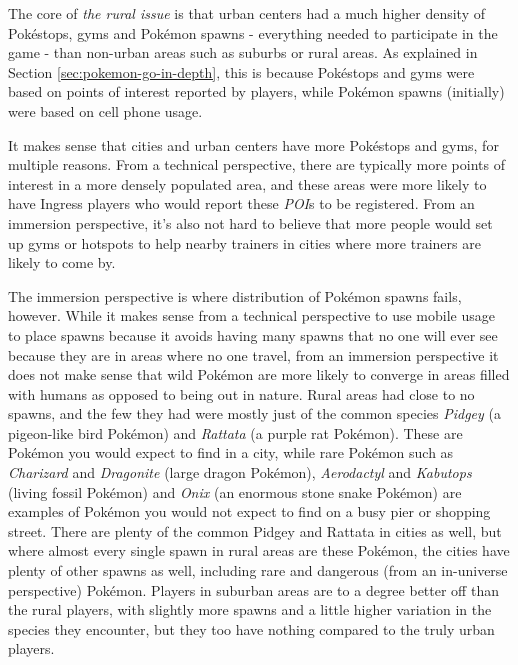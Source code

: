 The core of \emph{the rural issue} is that urban centers had a much higher density of Pokéstops, gyms and Pokémon spawns - everything needed to participate in the game - than non-urban areas such as suburbs or rural areas. As explained in Section \ref{sec:pokemon-go-in-depth}, this is because Pokéstops and gyms were based on points of interest reported by players, while Pokémon spawns (initially) were based on cell phone usage.

It makes sense that cities and urban centers have more Pokéstops and gyms, for multiple reasons. From a technical perspective, there are typically more points of interest in a more densely populated area, and these areas were more likely to have Ingress players who would report these \emph{POI}s to be registered. From an immersion perspective, it's also not hard to believe that more people would set up gyms or hotspots to help nearby trainers in cities where more trainers are likely to come by.

The immersion perspective is where distribution of Pokémon spawns fails, however. While it makes sense from a technical perspective to use mobile usage to place spawns because it avoids having many spawns that no one will ever see because they are in areas where no one travel, from an immersion perspective it does not make sense that wild Pokémon are more likely to converge in areas filled with humans as opposed to being out in nature. Rural areas had close to no spawns, and the few they had were mostly just of the common species \emph{Pidgey} (a pigeon-like bird Pokémon) and \emph{Rattata} (a purple rat Pokémon). These are Pokémon you would expect to find in a city, while rare Pokémon such as \emph{Charizard} and \emph{Dragonite} (large dragon Pokémon), \emph{Aerodactyl} and \emph{Kabutops} (living fossil Pokémon) and \emph{Onix} (an enormous stone snake Pokémon) are examples of Pokémon you would not expect to find on a busy pier or shopping street. There are plenty of the common Pidgey and Rattata in cities as well, but where almost every single spawn in rural areas are these Pokémon, the cities have plenty of other spawns as well, including rare and dangerous (from an in-universe perspective) Pokémon. Players in suburban areas are to a degree better off than the rural players, with slightly more spawns and a little higher variation in the species they encounter, but they too have nothing compared to the truly urban players.

\begin{figure}[h]
	\centering
	\caption{}
\end{figure}

